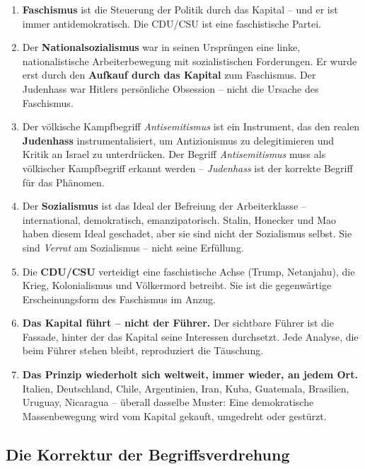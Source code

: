 \begin{enumerate}
    \item \textbf{Faschismus} ist die Steuerung der Politik durch das Kapital – und er ist immer antidemokratisch. Die CDU/CSU ist eine faschistische Partei.
    
    \item Der \textbf{Nationalsozialismus} war in seinen Ursprüngen eine linke, nationalistische Arbeiterbewegung mit sozialistischen Forderungen. Er wurde erst durch den \textbf{Aufkauf durch das Kapital} zum Faschismus. Der Judenhass war Hitlers persönliche Obsession – nicht die Ursache des Faschismus.
    
    \item Der völkische Kampfbegriff \emph{Antisemitismus} ist ein Instrument, das den realen \textbf{Judenhass} instrumentalisiert, um Antizionismus zu delegitimieren und Kritik an Israel zu unterdrücken. Der Begriff \emph{Antisemitismus} muss als völkischer Kampfbegriff erkannt werden – \emph{Judenhass} ist der korrekte Begriff für das Phänomen.
    
    \item Der \textbf{Sozialismus} ist das Ideal der Befreiung der Arbeiterklasse – international, demokratisch, emanzipatorisch. Stalin, Honecker und Mao haben diesem Ideal geschadet, aber sie sind nicht der Sozialismus selbst. Sie sind \emph{Verrat} am Sozialismus – nicht seine Erfüllung.
    
    \item Die \textbf{CDU/CSU} verteidigt eine faschistische Achse (Trump, Netanjahu), die Krieg, Kolonialismus und Völkermord betreibt. Sie ist die gegenwärtige Erscheinungsform des Faschismus im Anzug.
    
    \item \textbf{Das Kapital führt – nicht der Führer.} Der sichtbare Führer ist die Fassade, hinter der das Kapital seine Interessen durchsetzt. Jede Analyse, die beim Führer stehen bleibt, reproduziert die Täuschung.
    
    \item \textbf{Das Prinzip wiederholt sich weltweit, immer wieder, an jedem Ort.} Italien, Deutschland, Chile, Argentinien, Iran, Kuba, Guatemala, Brasilien, Uruguay, Nicaragua – überall dasselbe Muster: Eine demokratische Massenbewegung wird vom Kapital gekauft, umgedreht oder gestürzt.
\end{enumerate}

\subsection{Die Korrektur der Begriffsverdrehung}

